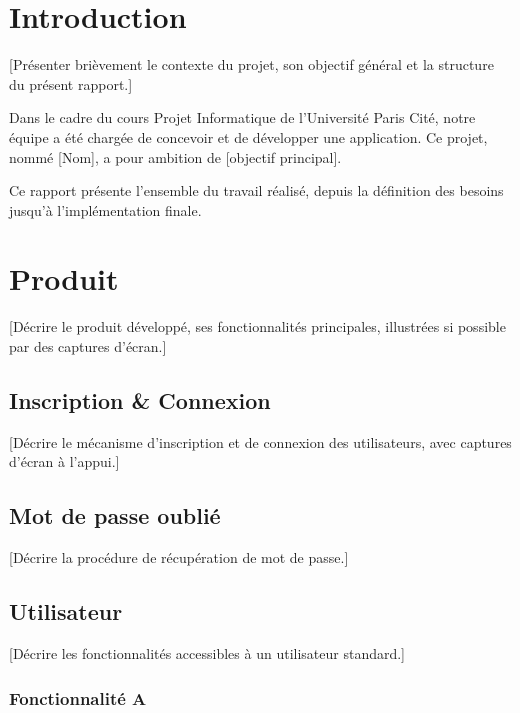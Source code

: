 \documentclass[12pt, a4paper]{article}
\begin{document}
\makecoverpage
\makesommaire

\section{Introduction}

[Présenter brièvement le contexte du projet, son objectif général et la
structure du présent rapport.]

Dans le cadre du cours Projet Informatique de l'Université Paris Cité, notre
équipe a été chargée de concevoir et de développer une application. Ce projet,
nommé [Nom], a pour ambition de [objectif principal].

Ce rapport présente l'ensemble du travail réalisé, depuis la définition des
besoins jusqu'à l'implémentation finale.

\section{Produit}

[Décrire le produit développé, ses fonctionnalités principales, illustrées
si possible par des captures d'écran.]

\subsection{Inscription \& Connexion}

[Décrire le mécanisme d'inscription et de connexion des utilisateurs, avec
captures d'écran à l'appui.]

\subsection{Mot de passe oublié}

[Décrire la procédure de récupération de mot de passe.]

\subsection{Utilisateur}

[Décrire les fonctionnalités accessibles à un utilisateur standard.]

\subsubsection{Fonctionnalité A}
\end{document}
